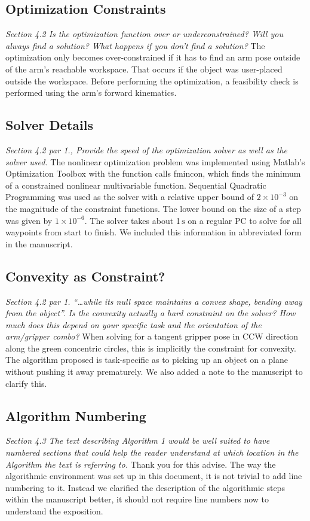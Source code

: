 \documentclass[letterpaper, 10 pt, twocolumn, conference]{article}
\newcommand{\unit}[1]{\ensuremath{\, \mathrm{#1}}} %
\begin{document}
\subsection{Optimization Constraints}
\textit{Section 4.2 Is the optimization function over or underconstrained? Will you always find a solution? What happens if you don’t find a solution?}
%
The optimization only becomes over-constrained if it has to find an arm pose outside of the arm's reachable workspace. That occurs if the object was user-placed outside the workspace. Before performing the optimization, a feasibility check is performed using the arm's forward kinematics.
%
\subsection{Solver Details}
\textit{Section 4.2 par 1., Provide the speed of the optimization solver as well as the solver used.}
%
The nonlinear optimization problem was implemented using Matlab’s Optimization Toolbox with the function calls fmincon, which finds the minimum of a constrained nonlinear multivariable function. Sequential Quadratic Programming was used as the solver with a relative upper bound of $2 \times 10^{-3}$ on the magnitude of the constraint functions. The lower bound on the size of a step was given by $1 \times 10^{-6}$. The solver takes about 1\unit{s} on a regular PC to solve for all waypoints from start to finish. We included this information in abbreviated form in the manuscript.
%
\subsection{Convexity as Constraint?}
\textit{Section 4.2 par 1. “…while its null space maintains a convex shape, bending away from the object”. Is the convexity actually a hard constraint on the solver? How much does this depend on your specific task and the orientation of the arm/gripper combo?}
%
When solving for a tangent gripper pose in CCW direction along the green concentric circles, this is implicitly the constraint for convexity. The algorithm proposed is task-specific as to picking up an object on a plane without pushing it away prematurely. We also added a note to the manuscript to clarify this.
%
\subsection{Algorithm Numbering}
\textit{Section 4.3 The text describing Algorithm 1 would be well suited to have numbered sections that could help the reader understand at which location in the Algorithm the text is referring to.}
%
Thank you for this advise. The way the algorithmic environment was set up in this document, it is not trivial to add line numbering to it. Instead we clarified the description of the algorithmic steps within the manuscript better, it should not require line numbers now to understand the exposition. 
%
\end{document}
